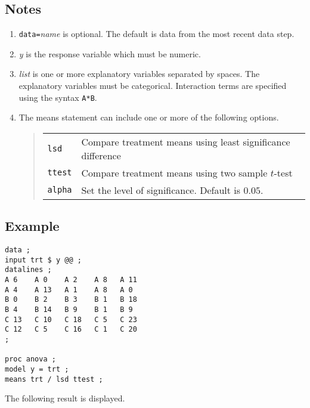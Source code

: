 \documentclass[12pt]{article}
\begin{document}
\subsection*{Notes}

\begin{enumerate}
\item
{\tt data=}{\it name} is optional.
The default is data from the most recent data step.
\item
{\it y} is the response variable which must be numeric.
\item
{\it list} is one or more explanatory variables separated by spaces.
The explanatory variables must be categorical.
Interaction terms are specified using the syntax {\tt A*B}.
\item
The means statement can include one or more of the following options.
\begin{quote}
\begin{tabular}{ll}
{\tt lsd} & Compare treatment means using least significance difference \\
{\tt ttest} & Compare treatment means using two sample $t$-test \\
{\tt alpha} & Set the level of significance. Default is $0.05$.
\end{tabular}
\end{quote}
\end{enumerate}

\subsection*{Example}

{\scriptsize\begin{verbatim}
data ;
input trt $ y @@ ;
datalines ;
A 6    A 0    A 2    A 8   A 11
A 4    A 13   A 1    A 8   A 0
B 0    B 2    B 3    B 1   B 18
B 4    B 14   B 9    B 1   B 9
C 13   C 10   C 18   C 5   C 23
C 12   C 5    C 16   C 1   C 20
;

proc anova ;
model y = trt ;
means trt / lsd ttest ;
\end{verbatim}}

The following result is displayed.
\end{document}
